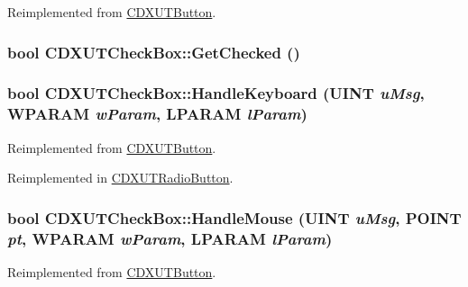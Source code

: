 Reimplemented from \hyperlink{class_c_d_x_u_t_button_a2209ea24f5ba76d7506b368c80940172}{CDXUTButton}.\hypertarget{class_c_d_x_u_t_check_box_a17449ea0718aa35b988bb6d079e36a58}{
\subsubsection[{GetChecked}]{\setlength{\rightskip}{0pt plus 5cm}bool CDXUTCheckBox::GetChecked ()}}
\label{class_c_d_x_u_t_check_box_a17449ea0718aa35b988bb6d079e36a58}
\hypertarget{class_c_d_x_u_t_check_box_a6e37b9b6be8e2c13df2927c1cf3d63ef}{
\subsubsection[{HandleKeyboard}]{\setlength{\rightskip}{0pt plus 5cm}bool CDXUTCheckBox::HandleKeyboard (UINT {\em uMsg}, \/  WPARAM {\em wParam}, \/  LPARAM {\em lParam})}}
\label{class_c_d_x_u_t_check_box_a6e37b9b6be8e2c13df2927c1cf3d63ef}


Reimplemented from \hyperlink{class_c_d_x_u_t_button_ae8da8eb3729b62ac3651eeca42d72530}{CDXUTButton}.

Reimplemented in \hyperlink{class_c_d_x_u_t_radio_button_a221492c2a117d1faaab749c1f3a88a4d}{CDXUTRadioButton}.\hypertarget{class_c_d_x_u_t_check_box_a4638ad4bb74d1a5fae3ba2b8b01072d6}{
\subsubsection[{HandleMouse}]{\setlength{\rightskip}{0pt plus 5cm}bool CDXUTCheckBox::HandleMouse (UINT {\em uMsg}, \/  POINT {\em pt}, \/  WPARAM {\em wParam}, \/  LPARAM {\em lParam})}}
\label{class_c_d_x_u_t_check_box_a4638ad4bb74d1a5fae3ba2b8b01072d6}


Reimplemented from \hyperlink{class_c_d_x_u_t_button_ac0bb3da0b5cc77e4cadfbbed72d3e5b7}{CDXUTButton}.

